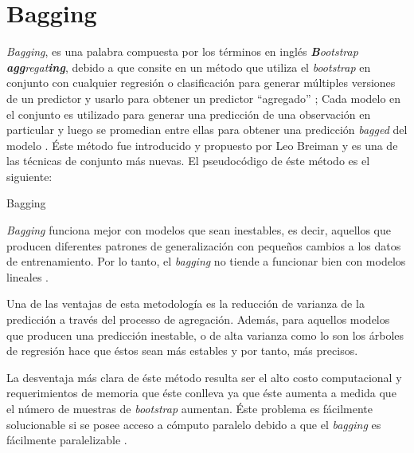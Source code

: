 \section{Bagging}
\textit{Bagging}, es una palabra compuesta por los términos en inglés \textit{\textbf{B}ootstrap \textbf{agg}regat\textbf{ing}}, 
debido a que consite en un método que utiliza el \textit{bootstrap} en conjunto con cualquier regresión o clasificación
para generar múltiples versiones de un predictor y usarlo para obtener un predictor ``agregado'' \cite{22}; Cada modelo en el conjunto es utilizado para generar una predicción de una observación en particular 
y luego se promedian entre ellas para obtener una predicción \textit{bagged} del modelo .
Éste método fue introducido y propuesto por Leo Breiman y es una de las técnicas
de conjunto más nuevas. El pseudocódigo de éste método es el siguiente:

\begin{algorithm}
    \caption{Bagging}

    \begin{algorithmic}[1]
        \ENDFOR

    \end{algorithmic}
\end{algorithm}

\textit{Bagging} funciona mejor con modelos que sean inestables, es decir, aquellos que producen diferentes
patrones de generalización con pequeños cambios a los datos de entrenamiento. Por lo tanto, el \textit{bagging} no tiende a funcionar bien con modelos lineales \cite{19}.

Una de las ventajas de esta metodología es la reducción de varianza de la predicción a través del processo de agregación. Además, para aquellos modelos que producen una predicción inestable,
o de alta varianza como lo son los árboles de regresión hace que éstos sean más estables \cite{18} y por tanto, más precisos.

La desventaja más clara de éste método resulta ser el alto costo computacional y requerimientos de memoria que éste conlleva ya que éste aumenta a medida que el número de muestras
de \textit{bootstrap} aumentan. Éste problema es fácilmente solucionable si se posee acceso a cómputo paralelo debido a que el \textit{bagging} es fácilmente paralelizable \cite{18}.
%
%
%
%
